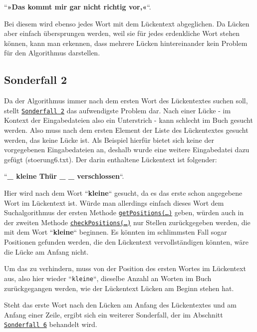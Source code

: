 \documentclass[a4paper, 10pt, ngerman]{scrartcl}
\begin{document}
``\textbf{»Das kommt mir gar nicht richtig vor,«}``.

Bei diesem wird ebenso jedes Wort mit dem Lückentext abgeglichen.
Da Lücken aber einfach übersprungen werden,
weil sie für jedes erdenkliche Wort stehen können,
kann man erkennen,
dass mehrere Lücken hintereinander kein Problem für den Algorithmus darstellen.

\subsection{Sonderfall 2}\label{sec:zweiterSonderfall}
Da der Algorithmus immer nach dem ersten Wort des Lückentextes suchen soll,
stellt \hyperref[sonderfallZwei]{\texttt{Sonderfall 2}} das aufwendigste Problem dar.
Nach einer Lücke
- im Kontext der Eingabedateien also ein Unterstrich -
kann schlecht im Buch gesucht werden.
Also muss nach dem ersten Element der Liste des Lückentextes gesucht werden,
das keine Lücke ist.
Als Beispiel hierfür bietet sich keine der vorgegebenen Eingabedateien an,
deshalb wurde eine weitere Eingabedatei dazu gefügt
(stoerung6.txt).
Der darin enthaltene Lückentext ist folgender:

``\textbf{\_ kleine Thür \_ \_ verschlossen}``.

Hier wird nach dem Wort ``\textbf{kleine}`` gesucht,
da es das erste schon angegebene Wort im Lückentext ist.
Würde man allerdings einfach dieses Wort dem Suchalgorithmus der ersten Methode \hyperref[sec:getPositions()]{\texttt{getPositions(\ldots)}} geben,
würden auch in der zweiten Methode \hyperref[sec:checkPositions()]{\texttt{checkPositions(\ldots)}} nur Stellen zurückgegeben werden,
die mit dem Wort ``\textbf{kleine}`` beginnen.
Es könnten im schlimmsten Fall sogar Positionen gefunden werden,
die den Lückentext vervollständigen könnten,
wäre die Lücke am Anfang nicht.

Um das zu verhindern,
muss von der Position des ersten Wortes im Lückentext aus,
also hier wieder ``\texttt{kleine}``,
dieselbe Anzahl an Worten im Buch zurückgegangen werden,
wie der Lückentext Lücken am Beginn stehen hat.

Steht das erste Wort nach den Lücken am Anfang des Lückentextes und am Anfang einer Zeile,
ergibt sich ein weiterer Sonderfall,
der im Abschnitt \hyperref[sec:sechsterSonderfall]{\texttt{Sonderfall 6}} behandelt wird.
\end{document}
